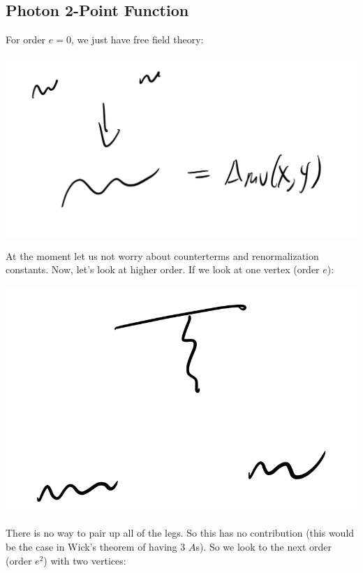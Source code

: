 \subsection{Photon 2-Point Function}
For order $e = 0$, we just have free field theory:

\begin{center}
    \includegraphics[scale=0.5]{Images/fig-lec31p4.png}
\end{center}

At the moment let us not worry about counterterms and renormalization constants. Now, let's look at higher order. If we look at one vertex (order $e$):

\begin{center}
    \includegraphics[scale=0.5]{Images/fig-lec31p5.png}
\end{center}

There is no way to pair up all of the legs. So this has no contribution (this would be the case in Wick's theorem of having 3 $A$s). So we look to the next order (order $e^2$) with two vertices:

